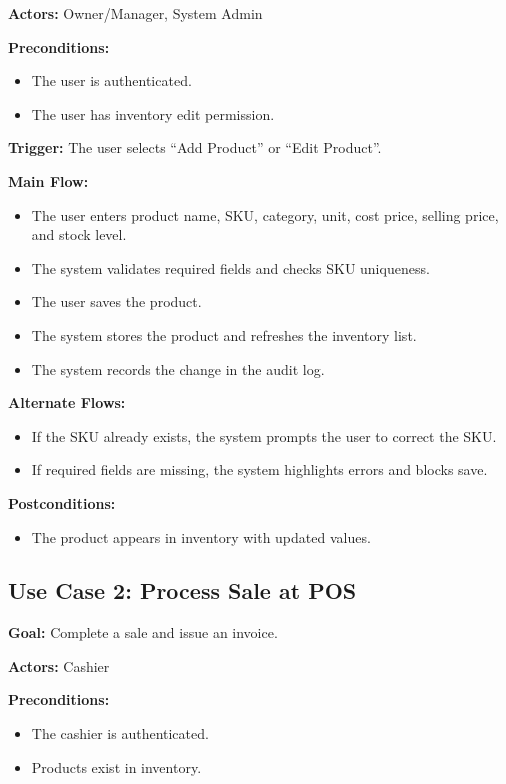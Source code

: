 \textbf{Actors:} Owner/Manager, System Admin

\textbf{Preconditions:}
\begin{itemize}
    \item The user is authenticated.
    \item The user has inventory edit permission.
\end{itemize}

\textbf{Trigger:} The user selects ``Add Product'' or ``Edit Product''.

\textbf{Main Flow:}
\begin{itemize}
    \item The user enters product name, SKU, category, unit, cost price, selling price, and stock level.
    \item The system validates required fields and checks SKU uniqueness.
    \item The user saves the product.
    \item The system stores the product and refreshes the inventory list.
    \item The system records the change in the audit log.
\end{itemize}

\textbf{Alternate Flows:}
\begin{itemize}
    \item If the SKU already exists, the system prompts the user to correct the SKU.
    \item If required fields are missing, the system highlights errors and blocks save.
\end{itemize}

\textbf{Postconditions:}
\begin{itemize}
    \item The product appears in inventory with updated values.
\end{itemize}

\subsection{Use Case 2: Process Sale at POS}
\textbf{Goal:} Complete a sale and issue an invoice.

\textbf{Actors:} Cashier

\textbf{Preconditions:}
\begin{itemize}
    \item The cashier is authenticated.
    \item Products exist in inventory.
\end{itemize}

